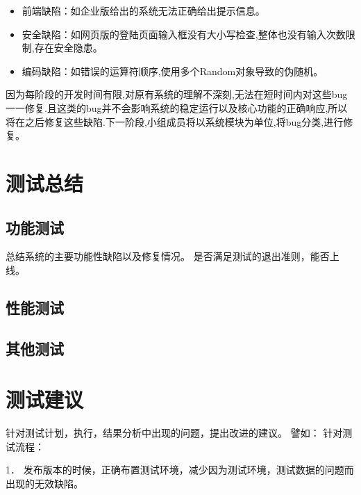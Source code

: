 \documentclass[hyperref, a4paper]{ctexart}
\providecommand{\tightlist}{%
  \setlength{\itemsep}{0pt}\setlength{\parskip}{0pt}}
\begin{document}
\begin{itemize}
\tightlist
\item
  前端缺陷：如企业版给出的系统无法正确给出提示信息。
\item
  安全缺陷：如网页版的登陆页面输入框没有大小写检查,整体也没有输入次数限制,存在安全隐患。
\item
  编码缺陷：如错误的运算符顺序,使用多个Random对象导致的伪随机。
\end{itemize}

因为每阶段的开发时间有限,对原有系统的理解不深刻,无法在短时间内对这些bug一一修复.且这类的bug并不会影响系统的稳定运行以及核心功能的正确响应,所以将在之后修复这些缺陷.下一阶段,小组成员将以系统模块为单位,将bug分类,进行修复。

\hypertarget{ux6d4bux8bd5ux603bux7ed3}{%
\section{测试总结}\label{ux6d4bux8bd5ux603bux7ed3}}

\hypertarget{ux529fux80fdux6d4bux8bd5}{%
\subsection{功能测试}\label{ux529fux80fdux6d4bux8bd5}}

总结系统的主要功能性缺陷以及修复情况。
是否满足测试的退出准则，能否上线。

\hypertarget{ux6027ux80fdux6d4bux8bd5-1}{%
\subsection{性能测试}\label{ux6027ux80fdux6d4bux8bd5-1}}

\hypertarget{ux5176ux4ed6ux6d4bux8bd5}{%
\subsection{其他测试}\label{ux5176ux4ed6ux6d4bux8bd5}}

\hypertarget{ux6d4bux8bd5ux5efaux8bae}{%
\section{测试建议}\label{ux6d4bux8bd5ux5efaux8bae}}

针对测试计划，执行，结果分析中出现的问题，提出改进的建议。 譬如：
针对测试流程：

1．
发布版本的时候，正确布置测试环境，减少因为测试环境，测试数据的问题而出现的无效缺陷。
\end{document}
